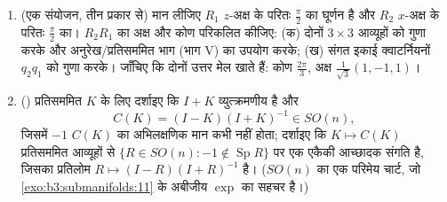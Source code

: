 \begin{problem}
\begin{enumerate}[resume]
  \item (एक संयोजन, तीन प्रकार से) मान लीजिए $R_1$ $z$-अक्ष के
        परितः $\frac\pi2$ का घूर्णन है और $R_2$ $x$-अक्ष के परितः
        $\frac\pi2$ का। $R_2R_1$ का अक्ष और कोण परिकलित कीजिए: (क) दोनों
        $3\times3$ आव्यूहों को गुणा करके और अनुरेख/प्रतिसममित भाग (भाग
        V) का उपयोग करके; (ख) संगत इकाई क्वाटर्नियनों $q_2q_1$ को
        गुणा करके। जाँचिए कि दोनों उत्तर मेल खाते हैं: कोण $\frac{2\pi}3$,
        अक्ष $\frac1{\sqrt3}(1, -1, 1)$।
  \item () प्रतिसममित $K$ के लिए दर्शाइए कि $I + K$
        व्युत्क्रमणीय है और
        \[
        C(K) = (I - K)(I + K)^{-1} \in SO(n),
        \]
        जिसमें $-1$ $C(K)$ का अभिलक्षणिक मान कभी नहीं होता;
        दर्शाइए कि $K \mapsto C(K)$ प्रतिसममित आव्यूहों से $\{R \in SO(n) : -1 \notin
        \operatorname{Sp}R\}$ पर एक एकैकी
        आच्छादक संगति है, जिसका प्रतिलोम $R \mapsto (I -
        R)(I + R)^{-1}$ है। ($SO(n)$ का एक
        परिमेय चार्ट, जो \cref{exo:b3:submanifolds:11} के अबीजीय $\exp$ का सहचर है।)
\end{enumerate}
\end{problem}
